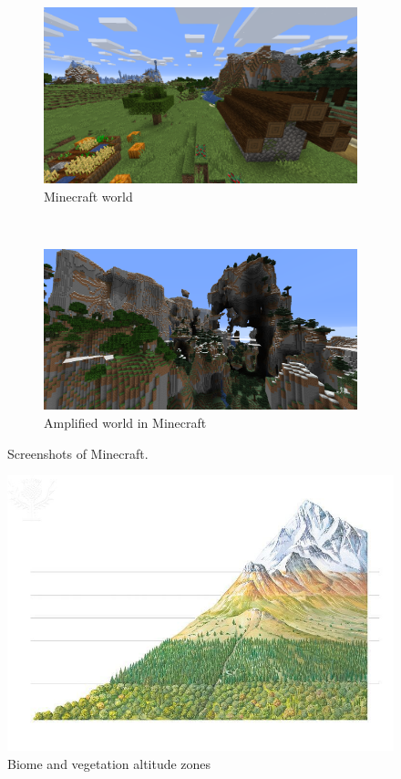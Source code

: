 \begin{figure}[H]
\centering
\begin{subfigure}{.48\linewidth}
  \centering
  \includegraphics[width=1\linewidth]{Planning report/images/minecraft1.png}
  \caption{Minecraft world}
  \label{fig:minecraft}
\end{subfigure}
~
\begin{subfigure}{.48\linewidth}
  \centering
  \includegraphics[width=1\linewidth]{Planning report/images/minecraft2.png}
  \caption{Amplified world in Minecraft}
\end{subfigure}
\caption{Screenshots of Minecraft.}
\label{fig:2_minecraft}
\end{figure}

\begin{figure}[H]
    \centering
    \includegraphics[width=0.5\linewidth]{Planning report/images/biome.jpg}
    \caption{Biome and vegetation altitude zones}
    \label{fig:biome}
\end{figure}


